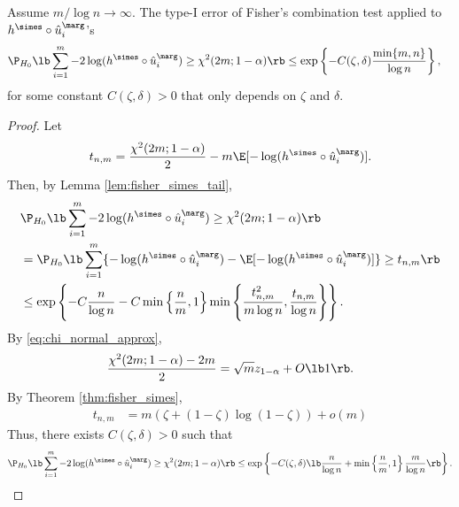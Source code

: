 \begin{thm}\label{thm:fisher_simes_effective_alpha}
  Assume $m / \log n\rightarrow \infty$. The type-I error of Fisher's combination test applied to $h^\simes\circ \hat{u}_i^\marg$'s
  \begin{align*}
    &\P_{H_0}\lb\sum_{i=1}^{m} -2\log(h^\simes \circ \hat{u}_i^\marg)\ge \chi^2(2m; 1 - \alpha)\rb \le \exp\left\{-C(\zeta, \delta)\frac{\min\{m, n\}}{\log n}\right\},
  \end{align*}
  for some constant $C(\zeta, \delta) > 0$ that only depends on $\zeta$ and $\delta$.
\end{thm}
\begin{proof}
  Let
  \[t_{n, m} = \frac{\chi^2(2m; 1 - \alpha)}{2} - m\E[-\log(h^\simes \circ \hat{u}_i^\marg)].\]
  Then, by Lemma \ref{lem:fisher_simes_tail},
  \begin{align*}
    &\P_{H_0}\lb \sum_{i=1}^{m} -2\log(h^\simes \circ \hat{u}_i^\marg)\ge \chi^2(2m; 1 - \alpha)\rb\\
    & = \P_{H_0}\lb \sum_{i=1}^{m} \{-\log(h^\simes \circ \hat{u}_i^\marg) - \E[-\log(h^\simes \circ \hat{u}_i^\marg)]\}\ge t_{n, m}\rb\\
    & \le \exp\left\{-C\frac{n}{\log n} - C\min\left\{\frac{n}{m}, 1\right\}\min\left\{\frac{t_{n,m}^2}{m\log n}, \frac{t_{n,m}}{\log n}\right\}\right\}.
  \end{align*}
  By \eqref{eq:chi_normal_approx},
  \[\frac{\chi^2(2m; 1 - \alpha) - 2m}{2} = \sqrt{m}z_{1-\alpha} + O\lb 1\rb.\]
  By Theorem \ref{thm:fisher_simes},
  \begin{align*}
    t_{n, m} &= m(\zeta + (1 - \zeta)\log(1 - \zeta)) + o(m)
  \end{align*}
  Thus, there exists $C(\zeta, \delta)> 0$ such that
  \[\P_{H_0}\lb \sum_{i=1}^{m} -2\log(h^\simes \circ \hat{u}_i^\marg)\ge \chi^2(2m; 1 - \alpha)\rb \le \exp\left\{-C(\zeta, \delta)\lb\frac{n}{\log n} + \min\left\{\frac{n}{m}, 1\right\}\frac{m}{\log n}\rb\right\}.\]

\end{proof}




